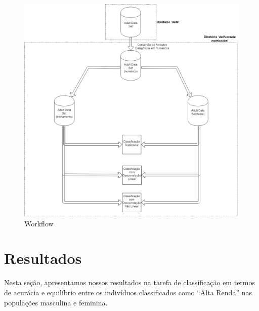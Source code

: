 \documentclass[11pt]{article}
\makeatletter
\def\maxwidth{\ifdim\Gin@nat@width>\linewidth\linewidth
    \else\Gin@nat@width\fi}
\let\Oldincludegraphics\includegraphics
\renewcommand{\includegraphics}[1]{\Oldincludegraphics[width=.8\maxwidth]{#1}}
\makeatother
\begin{document}
\begin{figure}[H]
\centering
\includegraphics{../fig/WorkflowIA369.png}
\caption{Workflow}
\end{figure}

    \hypertarget{resultados}{%
\section{Resultados}\label{resultados}}

Nesta seção, apresentamos nossos resultados na tarefa de classificação
em termos de acurácia e equilíbrio entre os indivíduos classificados
como ``Alta Renda'' nas populações masculina e feminina.
\end{document}
